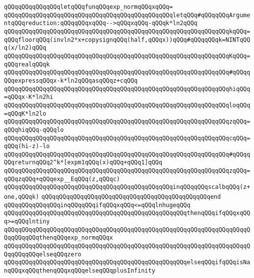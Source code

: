 \verb|qQQqqQQqqQQqqQQqletqQQqfunqQQqexp_normqQQqxqQQq=|\newline
\verb|qQQqqQQqqQQqqQQqqQQqqQQqqQQqqQQqqQQqqQQqqQQqqQQqletqQQq#qQQqqQQqArgumentqQQqreduction:qQQqqQQqxqQQq-->qQQqxqQQq-qQQqk*ln2qQQq|\newline
\verb|qQQqqQQqqQQqqQQqqQQqqQQqqQQqqQQqqQQqqQQqqQQqqQQqqQQqqQQqqQQqqQQqkqQQq=qQQqfloorqQQq(invln2*x+copysignqQQq(half,qQQqx))qQQq#qQQqqQQqk=NINTqQQq(x/ln2)qQQq|\newline
\verb|qQQqqQQqqQQqqQQqqQQqqQQqqQQqqQQqqQQqqQQqqQQqqQQqqQQqqQQqqQQqqQQqKqQQq=qQQqrealqQQqk|\newline
\verb|qQQqqQQqqQQqqQQqqQQqqQQqqQQqqQQqqQQqqQQqqQQqqQQqqQQqqQQqqQQqqQQq#qQQqqQQqexpressqQQqx-k*ln2qQQqasqQQqz+cqQQq|\newline
\verb|qQQqqQQqqQQqqQQqqQQqqQQqqQQqqQQqqQQqqQQqqQQqqQQqqQQqqQQqqQQqqQQqhiqQQq=qQQqx-K*ln2hi|\newline
\verb|qQQqqQQqqQQqqQQqqQQqqQQqqQQqqQQqqQQqqQQqqQQqqQQqqQQqqQQqqQQqqQQqloqQQq=qQQqK*ln2lo|\newline
\verb|qQQqqQQqqQQqqQQqqQQqqQQqqQQqqQQqqQQqqQQqqQQqqQQqqQQqqQQqqQQqqQQqzqQQq=qQQqhiqQQq-qQQqlo|\newline
\verb|qQQqqQQqqQQqqQQqqQQqqQQqqQQqqQQqqQQqqQQqqQQqqQQqqQQqqQQqqQQqqQQqcqQQq=qQQq(hi-z)-lo|\newline
\verb|qQQqqQQqqQQqqQQqqQQqqQQqqQQqqQQqqQQqqQQqqQQqqQQqqQQqqQQqqQQqqQQq#qQQqqQQqreturnqQQq2^k*[expm1qQQq(x)qQQq+qQQq1]qQQq|\newline
\verb|qQQqqQQqqQQqqQQqqQQqqQQqqQQqqQQqqQQqqQQqqQQqqQQqqQQqqQQqqQQqqQQqzqQQq=qQQqzqQQq+qQQqexp__EqQQq(z,qQQqc)|\newline
\verb|qQQqqQQqqQQqqQQqqQQqqQQqqQQqqQQqqQQqqQQqqQQqqQQqinqQQqqQQqscalbqQQq(z+one,qQQqk)|\newline
\verb|qQQqqQQqqQQqqQQqqQQqqQQqqQQqqQQqqQQqqQQqqQQqqQQqend|\newline
\verb|qQQqqQQqqQQqqQQqinqQQqqQQqifqQQqxqQQq<=qQQqlnhugeqQQq|\newline
\verb|qQQqqQQqqQQqqQQqqQQqqQQqqQQqqQQqqQQqqQQqqQQqqQQqqQQqthenqQQqifqQQqxqQQq>=qQQqlntiny|\newline
\verb|qQQqqQQqqQQqqQQqqQQqqQQqqQQqqQQqqQQqqQQqqQQqqQQqqQQqqQQqqQQqqQQqqQQqqQQqqQQqqQQqthenqQQqexp_normqQQqx|\newline
\verb|qQQqqQQqqQQqqQQqqQQqqQQqqQQqqQQqqQQqqQQqqQQqqQQqqQQqqQQqqQQqqQQqqQQqqQQqqQQqqQQqelseqQQqzero|\newline
\verb|qQQqqQQqqQQqqQQqqQQqqQQqqQQqqQQqqQQqqQQqqQQqqQQqqQQqelseqQQqifqQQqisNanqQQqxqQQqthenqQQqxqQQqelseqQQqplusInfinity|\newline
